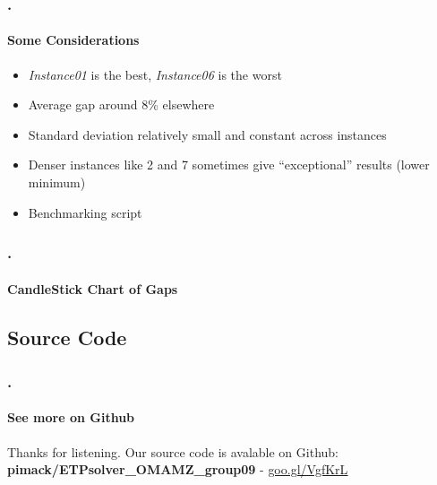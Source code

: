 \documentclass{beamer}
\begin{document}
\begin{frame}
\frametitle{\thesection.\thesubsection \ \insertsubsection}
\framesubtitle{Some Considerations}
\begin{itemize}
	\item \textit{Instance01} is the \alert{best}, \textit{Instance06} is the \alert{worst}
	\item Average gap around 8\% elsewhere
	\item Standard deviation relatively small and constant across instances
	\item Denser instances like 2 and 7 sometimes give ``exceptional'' results (lower minimum)
	\item Benchmarking script
\end{itemize}
\end{frame}

\begin{frame}
\frametitle{\thesection.\thesubsection \ \insertsubsection}
\framesubtitle{CandleStick Chart of Gaps}
\end{frame}



\subsection{Source Code}

\begin{frame}
\frametitle{\thesection.\thesubsection \ \insertsubsection}
\framesubtitle{See more on Github}
Thanks for listening.
\vfill
Our source code is avalable on Github:
\textbf{pimack/ETPsolver\_OMAMZ\_group09} -  \href{https://goo.gl/VgfKrL}{\underline{goo.gl/VgfKrL}}
\end{frame}
\end{document}

